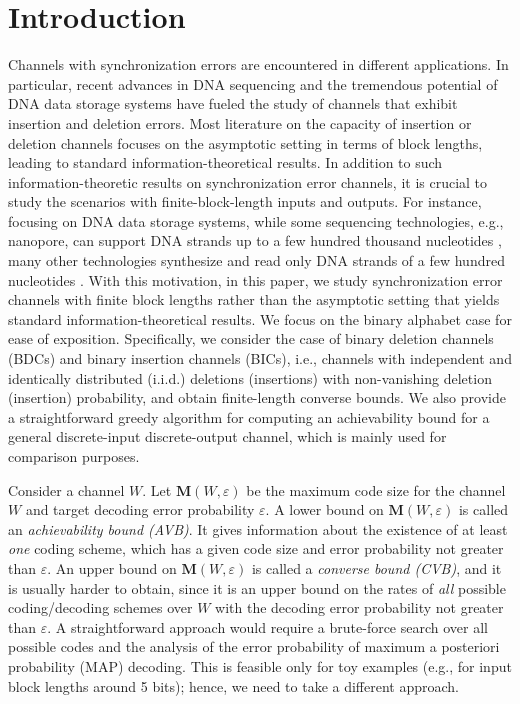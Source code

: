 \documentclass[journal, twocol]{IEEEtran}
\newcommand{\bfM}{{\mathbf{M}}}
\newcommand{\ve}{\varepsilon}
\begin{document}
\section{Introduction}

Channels with synchronization errors are encountered in different applications. 
In particular, recent advances in DNA sequencing and the tremendous potential of DNA data storage systems have fueled the study of channels that exhibit insertion and deletion errors. 
Most literature on the capacity of insertion or deletion channels focuses on the asymptotic setting in terms of block lengths, leading to standard information-theoretical results. In addition to such information-theoretic results on synchronization error channels, it is crucial to study the scenarios with finite-block-length inputs and outputs. 
For instance, focusing on DNA data storage systems, while some sequencing technologies, e.g., nanopore, can support DNA strands up to a few hundred thousand nucleotides \cite{deamer16three}, many other technologies synthesize and read only DNA strands of a few hundred nucleotides  \cite{church12next, goldman13towards, antkowiak20low, mao18models, hamoum23channel,welter24end}.
With this motivation, in this paper, we study synchronization error channels with finite block lengths rather than the asymptotic setting that yields standard information-theoretical results. We focus on the binary alphabet case for ease of exposition. Specifically, we consider the case of binary deletion channels (BDCs) and binary insertion channels (BICs), i.e., channels with independent and identically distributed (i.i.d.) deletions (insertions) with non-vanishing deletion (insertion) probability, and obtain finite-length converse bounds.
We also provide a straightforward greedy algorithm for computing an achievability bound for a general discrete-input discrete-output channel, which is mainly used for comparison purposes. 

Consider a channel $W$. 
Let $\bfM(W,\ve)$ be the maximum code size for the channel $W$ and target decoding error probability $\ve$. 
A lower bound on $\bfM(W,\ve)$ is called an \emph{achievability bound (AVB)}.
It gives information about the existence of at least \emph{one} coding scheme, which has a given code size and error probability not greater than $\ve$. 
An upper bound on $\bfM(W,\ve)$ is called a \emph{converse bound (CVB)}, and it is usually harder to obtain, since it is an upper bound on the rates of \emph{all} possible coding/decoding schemes over $W$ with the decoding error probability not greater than $\ve$.
A straightforward approach would require a brute-force search over all possible codes and the analysis of the error probability of maximum a posteriori probability (MAP) decoding.
This is feasible only for toy examples (e.g., for input block lengths around 5 bits); hence, we need to take a different approach.
\end{document}
